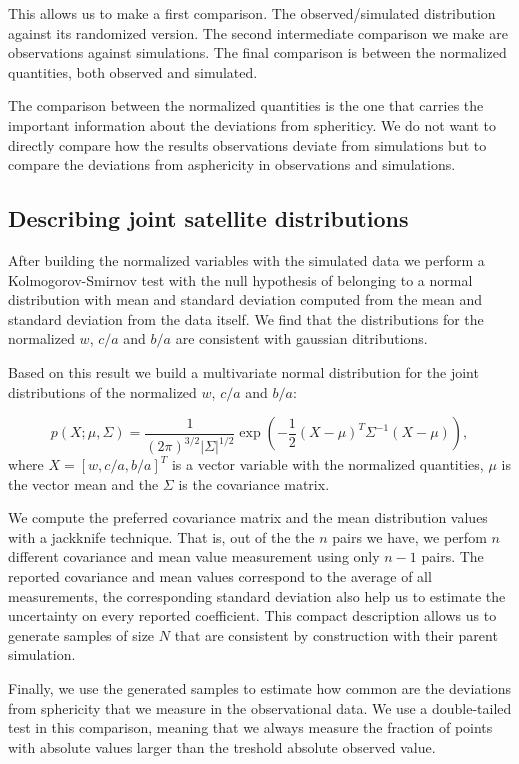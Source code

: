 \documentclass[a4paper,fleqn,usenatbib]{mnras}
\begin{document}
This allows us to make a first comparison. 
The observed/simulated
distribution against its randomized version. 
The second intermediate comparison we make are observations against
simulations.
The final comparison is between the normalized quantities, both
observed and simulated.

The comparison between the normalized quantities is the one that
carries the important information about the deviations from
spheriticy. 
We do not want to directly compare how the results observations
deviate from simulations but to compare the deviations from
asphericity in observations and simulations. 


\subsection{Describing joint satellite distributions}

After building the normalized variables with the simulated data we
perform  a Kolmogorov-Smirnov test with the null hypothesis of belonging
to a normal distribution with mean and standard deviation computed
from the mean and standard deviation from the data itself. 
We find that the distributions for the normalized $w$, $c/a$ and $b/a$
are consistent with gaussian ditributions.


Based on this result we build a multivariate normal distribution for
the joint distributions of the normalized $w$, $c/a$ and $b/a$:

\begin{equation}
p(X; \mu, \Sigma) = \frac{1}{(2\pi)^{3/2}|\Sigma|^{1/2}}
\exp\left(-\frac{1}{2}(X-\mu)^{T}\Sigma^{-1}(X-\mu)\right), 
\label{eq:multivariate}
\end{equation}
% 
where $X=[w, c/a, b/a]^{T}$ is a vector variable with the normalized
quantities, $\mu$ is the vector mean and the $\Sigma$ is the
covariance matrix.  

We compute the preferred covariance matrix and the mean distribution values
with a jackknife technique. 
That is, out of the the $n$ pairs we have, we perfom $n$ different
covariance and mean value measurement using only $n-1$ pairs. 
The reported covariance and mean values correspond to the average of
all measurements, the corresponding standard deviation also help us to
estimate the uncertainty on every reported coefficient.
This compact description allows us to generate samples of size $N$
that are consistent by construction with their parent simulation. 

Finally, we use the generated samples to estimate how
common are the deviations from sphericity that we measure in the
observational data.  
We use a double-tailed test in this comparison, meaning that we
always measure the fraction of points with absolute values larger than the
treshold absolute observed value. 
\end{document}
